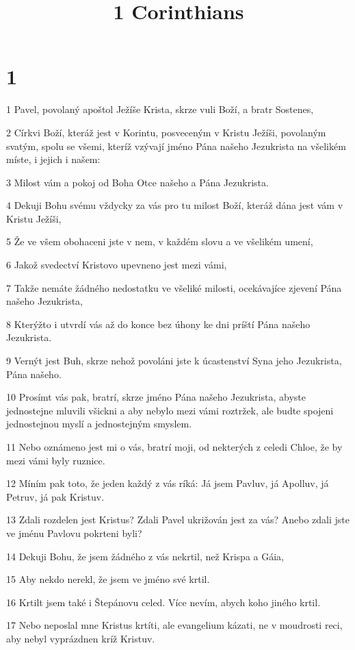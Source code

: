 

\title{1 Corinthians}

\chapter{1}

\par 1 Pavel, povolaný apoštol Ježíše Krista, skrze vuli Boží, a bratr Sostenes,
\par 2 Církvi Boží, kteráž jest v Korintu, posveceným v Kristu Ježíši, povolaným svatým, spolu se všemi, kteríž vzývají jméno Pána našeho Jezukrista na všelikém míste, i jejich i našem:
\par 3 Milost vám a pokoj od Boha Otce našeho a Pána Jezukrista.
\par 4 Dekuji Bohu svému vždycky za vás pro tu milost Boží, kteráž dána jest vám v Kristu Ježíši,
\par 5 Že ve všem obohaceni jste v nem, v každém slovu a ve všelikém umení,
\par 6 Jakož svedectví Kristovo upevneno jest mezi vámi,
\par 7 Takže nemáte žádného nedostatku ve všeliké milosti, ocekávajíce zjevení Pána našeho Jezukrista,
\par 8 Kterýžto i utvrdí vás až do konce bez úhony ke dni príští Pána našeho Jezukrista.
\par 9 Vernýt jest Buh, skrze nehož povoláni jste k úcastenství Syna jeho Jezukrista, Pána našeho.
\par 10 Prosímt vás pak, bratrí, skrze jméno Pána našeho Jezukrista, abyste jednostejne mluvili všickni a aby nebylo mezi vámi roztržek, ale budte spojeni jednostejnou myslí a jednostejným smyslem.
\par 11 Nebo oznámeno jest mi o vás, bratrí moji, od nekterých z celedi Chloe, že by mezi vámi byly ruznice.
\par 12 Míním pak toto, že jeden každý z vás ríká: Já jsem Pavluv, já Apolluv, já Petruv, já pak Kristuv.
\par 13 Zdali rozdelen jest Kristus? Zdali Pavel ukrižován jest za vás? Anebo zdali jste ve jménu Pavlovu pokrteni byli?
\par 14 Dekuji Bohu, že jsem žádného z vás nekrtil, než Krispa a Gáia,
\par 15 Aby nekdo nerekl, že jsem ve jméno své krtil.
\par 16 Krtilt jsem také i Štepánovu celed. Více nevím, abych koho jiného krtil.
\par 17 Nebo neposlal mne Kristus krtíti, ale evangelium kázati, ne v moudrosti reci, aby nebyl vyprázdnen kríž Kristuv.
